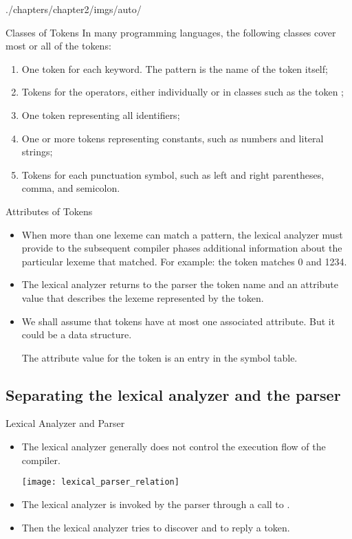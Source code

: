 \begin{graphicspathcontext}{{./chapters/chapter2/imgs/auto/}}
\begin{bibunit}[apalike]
\begin{frame}{Classes of Tokens}
	In many programming languages, the following classes cover most or all of the tokens:
	\begin{enumerate}
	\item One token for each keyword. The pattern is the name of the token itself;
	\item Tokens for the operators, either individually or in classes such as the token ;
	\item One token representing all identifiers;
	\item One or more tokens representing constants, such as numbers and literal strings;
	\item Tokens for each punctuation symbol, such as left and right parentheses, comma, and semicolon.
	\end{enumerate}
\end{frame}

\begin{frame}{Attributes of Tokens}
	\begin{itemize}
	\item When more than one lexeme can match a pattern, the lexical analyzer must provide to the subsequent compiler phases additional information about the particular lexeme that matched.
For example: the token  matches 0 and 1234.
	\item The lexical analyzer returns to the parser the token name and an attribute value that describes the lexeme represented by the token.
	\item We shall assume that tokens have at most one associated attribute. But it could be a data structure.
		\begin{example}
		The attribute value for the token  is an entry in the symbol table.
		\end{example}
	\end{itemize}
\end{frame}

\subsection{Separating the lexical analyzer and the parser}
\begin{frame}{Lexical Analyzer and Parser}
	\begin{itemize}
	\item The lexical analyzer generally does not control the execution flow of the compiler.
	\vfill
		\begin{center}
			\texttt{[image: lexical\_parser\_relation]}
		\end{center}
	\vfill
	\item The lexical analyzer is invoked by the parser through a call to .
	\item Then the lexical analyzer tries to discover and to reply a token.
	\end{itemize}
\end{frame}


\end{bibunit}
\end{graphicspathcontext}

